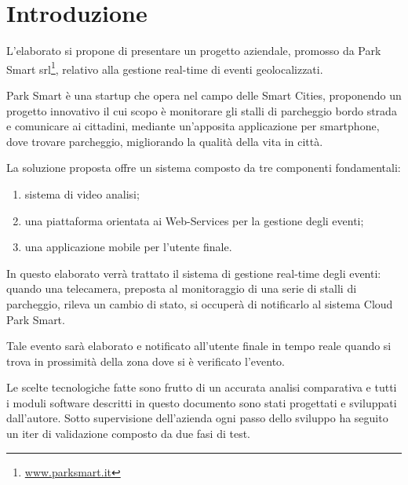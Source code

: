 \chapter{Introduzione}
L'elaborato si propone di presentare un progetto aziendale, promosso da Park Smart srl\footnote{\href{http://www.parksmart.it}{www.parksmart.it}}, relativo alla gestione real-time di eventi geolocalizzati. 

Park Smart è una startup che opera nel campo delle Smart Cities, proponendo un progetto innovativo il cui scopo è monitorare gli stalli di parcheggio bordo strada e comunicare ai cittadini, mediante un'apposita applicazione per smartphone, dove trovare parcheggio, migliorando la qualità della vita in città.

La soluzione proposta offre un sistema composto da tre componenti fondamentali:

\begin{enumerate}
\item sistema di video analisi;
\item una piattaforma orientata ai Web-Services per 
la gestione degli eventi;
\item una applicazione mobile per l'utente finale.
\end{enumerate}


In questo elaborato verrà trattato il sistema di gestione real-time degli eventi: quando una telecamera, preposta al monitoraggio di una serie di stalli di parcheggio, rileva un cambio di stato, si occuper\`a di notificarlo al sistema Cloud Park Smart.

Tale evento sarà elaborato e notificato all'utente finale in tempo reale quando si trova in prossimit\`a della zona dove si è verificato l'evento. 

Le scelte tecnologiche fatte sono frutto di un accurata analisi comparativa e tutti i moduli software descritti in questo documento sono stati progettati e sviluppati dall'autore. Sotto supervisione dell'azienda ogni passo dello sviluppo ha seguito un iter di validazione composto da due fasi di test.



